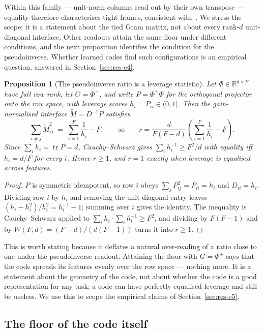 \documentclass[preprint,12pt]{elsarticle}
\newtheorem{proposition}[theorem]{Proposition}
\theoremstyle{definition}
\newcommand{\R}{\mathbb{R}}
\begin{document}
Within this family --- unit-norm columns read out by their own transpose --- equality therefore
characterises tight frames, consistent
with~\cite{waldron2003generalized,datta2012geometry}. We stress the scope: it is a statement
about the tied Gram matrix, not about every rank-$d$ unit-diagonal interface. Other readouts
attain the same floor under different conditions, and the next proposition identifies the
condition for the pseudoinverse. Whether learned codes find such configurations is an empirical
question, answered in Section~\ref{sec:res-e4}.

\begin{proposition}[The pseudoinverse ratio is a leverage statistic]
\label{prop:leverage}
Let $\Phi\in\R^{d\times F}$ have full row rank, let $G=\Phi^{+}$, and write
$P=\Phi^{+}\Phi$ for the orthogonal projector onto the row space, with leverage scores
$h_i=P_{ii}\in(0,1]$. Then the gain-normalised interface $\widetilde M=D^{-1}P$ satisfies
\[
  \sum_{i\neq j}\widetilde M_{ij}^{2}\;=\;\sum_{i=1}^{F}\frac1{h_i}-F ,
  \qquad\text{so}\qquad
  r=\frac{d}{F(F-d)}\left(\sum_{i=1}^{F}\frac1{h_i}-F\right).
\]
Since $\sum_i h_i=\operatorname{tr}P=d$, Cauchy--Schwarz gives $\sum_i h_i^{-1}\ge F^2/d$ with
equality iff $h_i=d/F$ for every $i$. Hence $r\ge1$, and $r=1$ exactly when leverage is
equalised across features.
\end{proposition}

\begin{proof}
$P$ is symmetric idempotent, so row $i$ obeys $\sum_j P_{ij}^2=P_{ii}=h_i$ and $D_{ii}=h_i$.
Dividing row $i$ by $h_i$ and removing the unit diagonal entry leaves
$(h_i-h_i^2)/h_i^2=h_i^{-1}-1$; summing over $i$ gives the identity. The inequality is
Cauchy--Schwarz applied to $\sum_i h_i\cdot\sum_i h_i^{-1}\ge F^2$, and dividing by $F(F-1)$
and by $W(F,d)=(F-d)/(d(F-1))$ turns it into $r\ge1$.
\end{proof}

This is worth stating because it deflates a natural over-reading of a ratio close to one under
the pseudoinverse readout. Attaining the floor with $G=\Phi^{+}$ says that the code spreads its
features evenly over the row space --- nothing more. It is a statement about the geometry of the
code, not about whether the code is a good representation for any task; a code can have
perfectly equalised leverage and still be useless. We use this to scope the empirical claims of
Section~\ref{sec:res-e5}.

\subsection{The floor of the code itself}
\label{sec:codefloor}
\end{document}
